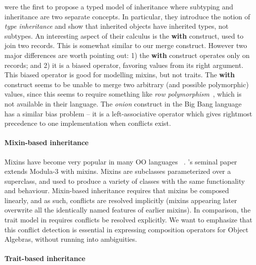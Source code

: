 \citet{cook1989inheritance} were the first to propose a typed model of
inheritance where subtyping and inheritance are two separate concepts. In
particular, they introduce the notion of \textit{type inheritance} and show that
inherited objects have inherited types, not subtypes. An interesting aspect of
their calculus is the \textbf{with} construct, used to join two records. This is
somewhat similar to our merge construct. However two major differences are worth
pointing out: 1) the \textbf{with} construct operates only on records; and 2) it
is a biased operator, favoring values from its right argument. This biased
operator is good for modelling mixins, but not traits. The
\textbf{with} construct seems to be unable to merge two arbitrary (and possible
polymorphic) values, since this seems to require something like
\emph{row polymorphism}~\cite{wand1987complete,wand1989type}, which is not available in their language.
The \textit{onion} construct in the Big Bang
language~\cite{palmer2015building,menon2012big} has a similar bias problem -- it is a
left-associative operator which gives rightmost precedence to one
implementation when conflicts exist.

\paragraph{Mixin-based inheritance}

Mixins have become very popular in many OO languages
~\cite{flatt1998classes,bono1999core, ancona2003jam}. \citeauthor{bracha1990mixin}'s
seminal paper~\citep{bracha1990mixin} extends Modula-3 with mixins. Mixins are subclasses parameterized
over a superclass, and used to produce a variety of classes with the same
functionality and behaviour. Mixin-based inheritance requires that mixins be
composed linearly, and as such, conflicts are resolved implicitly (mixins
appearing later overwrite all the identically named features of earlier mixins).
In comparison, the trait model in \name requires conflicts be resolved
explicitly. We want to emphasize that this conflict detection is essential in
expressing composition operators for Object Algebras, without running
into ambiguities.


\paragraph{Trait-based inheritance}

